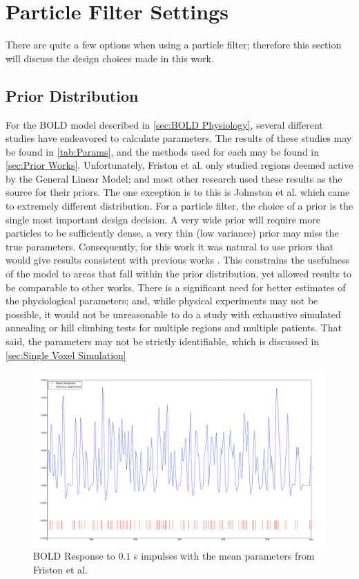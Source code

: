 \section{Particle Filter Settings}
There are quite a few options when using a particle filter; therefore this
section will discuss the design choices made in this work.

\subsection{Prior Distribution}
\label{sec:PriorDist}
For the \ac{BOLD} model described in \autoref{sec:BOLD Physiology}, several
different studies have endeavored to calculate parameters. The results
of these studies may be found in \autoref{tab:Params}, and the methods
used for each may be found in \autoref{sec:Prior Works}. Unfortunately,
Friston et al. \cite{Friston2002b} only studied regions deemed active 
by the General
Linear Model; and most other research used these results as
the source for their priors.
The one exception is to this is Johnston et al. \cite{Johnston2007} 
which came to extremely different distribution. For a particle filter, 
the choice of a prior is
the single most important design decision. A very wide prior will require
more particles to be sufficiently dense, a very thin (low variance) prior may miss
the true parameters. Consequently, for this work it was natural
to use priors that would give results consistent with previous works
\cite{Friston2002b}. This constrains the usefulness of the model to
areas that fall within the prior distribution, yet allowed results
to be comparable to other works. There is a significant need for better
estimates of the physiological parameters; and, while physical experiments
may not be possible, it would not be unreasonable to do a study with
exhaustive simulated annealing or hill climbing tests for multiple
regions and multiple patients. That said, the parameters may  not be
strictly identifiable, which is discussed in
\autoref{sec:Single Voxel Simulation}

\begin{figure}
\centering
\includegraphics[trim=6cm 2cm 6cm 2cm,width=15cm]{images/mean_response}
\caption{BOLD Response to $0.1$ s impulses with the mean parameters from 
Friston et al. \cite{Friston2002b}}
\label{fig:MeanResponseF}
\end{figure}

